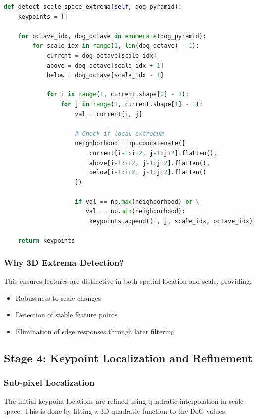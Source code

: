\documentclass[12pt,a4paper]{article}
\begin{document}
\begin{lstlisting}[language=Python]
def detect_scale_space_extrema(self, dog_pyramid):
    keypoints = []
    
    for octave_idx, dog_octave in enumerate(dog_pyramid):
        for scale_idx in range(1, len(dog_octave) - 1):
            current = dog_octave[scale_idx]
            above = dog_octave[scale_idx + 1]
            below = dog_octave[scale_idx - 1]
            
            for i in range(1, current.shape[0] - 1):
                for j in range(1, current.shape[1] - 1):
                    val = current[i, j]
                    
                    # Check if local extremum
                    neighborhood = np.concatenate([
                        current[i-1:i+2, j-1:j+2].flatten(),
                        above[i-1:i+2, j-1:j+2].flatten(),
                        below[i-1:i+2, j-1:j+2].flatten()
                    ])
                    
                    if val == np.max(neighborhood) or \
                       val == np.min(neighborhood):
                        keypoints.append((i, j, scale_idx, octave_idx))
    
    return keypoints
\end{lstlisting}

\subsubsection{Why 3D Extrema Detection?}
This ensures features are distinctive in both spatial location and scale, providing:
\begin{itemize}
    \item Robustness to scale changes
    \item Detection of stable feature points
    \item Elimination of edge responses through later filtering
\end{itemize}

\subsection{Stage 4: Keypoint Localization and Refinement}

\subsubsection{Sub-pixel Localization}
The initial keypoint locations are refined using quadratic interpolation in scale-space. This is done by fitting a 3D quadratic function to the DoG values.
\end{document}
